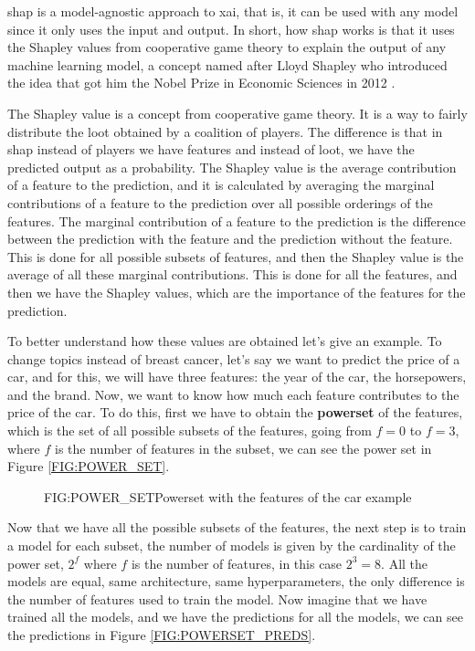 
\ac{shap} \cite{lundberg_unified_2017} is a model-agnostic approach to \ac{xai}, that is, it can be used with any model since it only uses the input and output. In short, how \ac{shap} works is that it uses the Shapley values from cooperative game theory to explain the output of any machine learning model, a concept named after Lloyd Shapley who introduced the idea that got him the Nobel Prize in Economic Sciences in 2012 \cite{roth_shapley_1988}.

The Shapley value is a concept from cooperative game theory. It is a way to fairly distribute the loot obtained by a coalition of players. The difference is that in \ac{shap} instead of players we have features and instead of loot, we have the predicted output as a probability. The Shapley value is the average contribution of a feature to the prediction, and it is calculated by averaging the marginal contributions of a feature to the prediction over all possible orderings of the features. The marginal contribution of a feature to the prediction is the difference between the prediction with the feature and the prediction without the feature. 
This is done for all possible subsets of features, and then the Shapley value is the average of all these marginal contributions. 
This is done for all the features, and then we have the Shapley values, which are the importance of the features for the prediction. 

To better understand how these values are obtained 
let's 
give an example. To change topics instead of breast cancer, 
let's 
say we want to predict the price of a car, and for this, we will have three features: the year of the car, the horsepowers, and the brand. Now, we want to know how much each feature contributes to the price of the car. To do this, first we have to obtain the \textbf{powerset} of the features, which is the set of all possible subsets of the features, going from $f=0$ to $f=3$, where $f$ is the number of features in the subset, we can see the power set in Figure \ref{FIG:POWER_SET}.

\begin{figure}[Powerset Example]{FIG:POWER_SET}{Powerset with the features of the car example}
\end{figure}

Now that we have all the possible subsets of the features, the next step is to train a model for each subset, the number of models is given by the cardinality of the power set, $2^f$ where $f$ is the number of features, in this case $2^3=8$. All the models are equal, same architecture, same hyperparameters, the only difference is the number of features used to train the model. Now imagine that we have trained all the models, and we have the predictions for all the models, we can see the predictions in Figure \ref{FIG:POWERSET_PREDS}.

